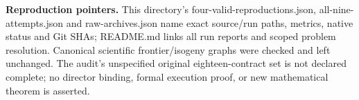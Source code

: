 \documentclass[10pt]{article}
\begin{document}
\par\textbf{Reproduction pointers.} This directory's four-valid-reproductions.json, all-nine-attempts.json and raw-archives.json name exact source/run paths, metrics, native status and Git SHAs; README.md links all run reports and scoped problem resolution. Canonical scientific frontier/isogeny graphs were checked and left unchanged. The audit's unspecified original eighteen-contract set is not declared complete; no director binding, formal execution proof, or new mathematical theorem is asserted.
\end{document}
